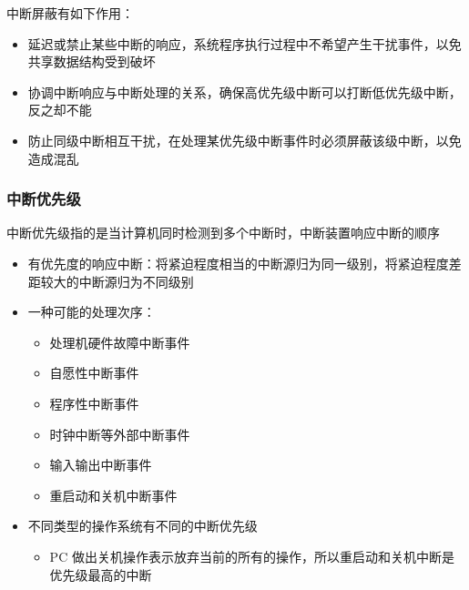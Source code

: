 \documentclass[cs4size,a4paper,10pt]{ctexart}
\begin{document}
	中断屏蔽有如下作用：
	\begin{itemize}
		\item 延迟或禁止某些中断的响应，系统程序执行过程中不希望产生干扰事件，以免共享数据结构受到破坏
		\item 协调中断响应与中断处理的关系，确保高优先级中断可以打断低优先级中断，反之却不能
		\item 防止同级中断相互干扰，在处理某优先级中断事件时必须屏蔽该级中断，以免造成混乱
	\end{itemize}


	\subsubsection{中断优先级}
	中断优先级指的是当计算机同时检测到多个中断时，中断装置响应中断的顺序
	\begin{itemize}
		\item 有优先度的响应中断：将紧迫程度相当的中断源归为同一级别，将紧迫程度差距较大的中断源归为不同级别
		\item 一种可能的处理次序：
		\begin{itemize}
			\item 处理机硬件故障中断事件
			\item 自愿性中断事件
			\item 程序性中断事件
			\item 时钟中断等外部中断事件
			\item 输入输出中断事件
			\item 重启动和关机中断事件
		\end{itemize}
		\item 不同类型的操作系统有不同的中断优先级
		\begin{itemize}
			\item PC 做出关机操作表示放弃当前的所有的操作，所以重启动和关机中断是优先级最高的中断
		\end{itemize}
	\end{itemize}
\end{document}

